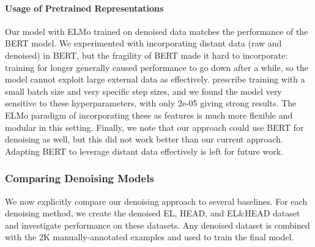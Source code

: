 \documentclass[11pt,a4paper]{article}
\begin{document}
\vspace{-4pt}
\paragraph{Usage of Pretrained Representations} Our model with ELMo trained on denoised data matches the performance of the BERT model. We experimented with incorporating distant data (raw and denoised) in BERT, but the fragility of BERT made it hard to incorporate: training for longer generally caused performance to go down after a while, so the model cannot exploit large external data as effectively. \citet{BERT18} prescribe training with a small batch size and very specific step sizes, and we found the model very sensitive to these hyperparameters, with only 2e-05 giving strong results. The ELMo paradigm of incorporating these as features is much more flexible and modular in this setting. Finally, we note that our approach could use BERT for denoising as well, but this did not work better than our current approach. Adapting BERT to leverage distant data effectively is left for future work.




\subsubsection{Comparing Denoising Models}

We now explicitly compare our denoising approach to several baselines. For each denoising method, we create the denoised EL, HEAD, and EL\:\&\:HEAD dataset and investigate performance on these datasets. Any denoised dataset is combined with the 2K manually-annotated examples and used to train the final model.

\vspace{-4pt}
\end{document}
